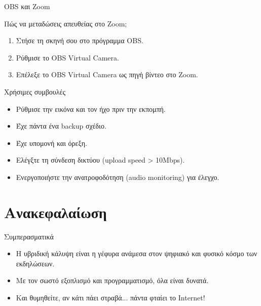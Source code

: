 \documentclass{beamer}
\begin{document}
\begin{frame}{OBS και Zoom}
  \begin{block}{Πώς να μεταδώσεις απευθείας στο Zoom;}
    \begin{enumerate}
    \item Στήσε τη σκηνή σου στο πρόγραμμα OBS.
    \item Ρύθμισε το OBS Virtual Camera.
    \item Επέλεξε το OBS Virtual Camera ως πηγή βίντεο στο Zoom.
    \end{enumerate}
  \end{block}
    \begin{exampleblock}{Χρήσιμες συμβουλές}
    \begin{itemize}
    \item Ρύθμισε την εικόνα και τον ήχο πριν την εκπομπή.
    \item Έχε πάντα ένα backup σχέδιο.
    \item Έχε υπομονή και όρεξη.
    \item Ελέγξτε τη σύνδεση δικτύου (upload speed > 10Mbps).
    \item Ενεργοποιήστε την ανατροφοδότηση (audio monitoring) για έλεγχο.
    \end{itemize}
  \end{exampleblock}
  \end{frame}

\section{Ανακεφαλαίωση}
\begin{frame}{Συμπερασματικά}
  \begin{itemize}
  \item Η υβριδική κάλυψη είναι η γέφυρα ανάμεσα στον ψηφιακό και φυσικό κόσμο των εκδηλώσεων.
  \item Με τον σωστό εξοπλισμό και προγραμματισμό, όλα είναι δυνατά.
  \item Και θυμηθείτε, αν κάτι πάει στραβά... πάντα φταίει το Internet!
  \end{itemize}
\end{frame}
\end{document}

